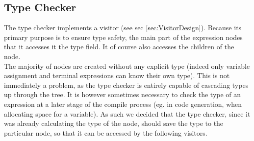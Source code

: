\subsection{Type Checker}
\label{sec:typeCheckerDesign}
The type checker implements a visitor (see sec \ref{sec:VisitorDesign}). 
Because its primary purpose is to ensure type safety, the main part of the expression nodes that it accesses it the type field. It of course also accesses the children of the node.\\

The majority of nodes are created without any explicit type (indeed only variable
assignment and terminal expressions can know their own type). This is not immediately
a problem, as the type checker is entirely capable of cascading types up through the
tree. It is however sometimes necessary to check the type of an expression at a later
stage of the compile process (eg. in code generation, when allocating space for a variable). As such we decided that the type checker, since it was already calculating the type of the node, should save the type to the particular node, so that it can be accessed by the following visitors.
